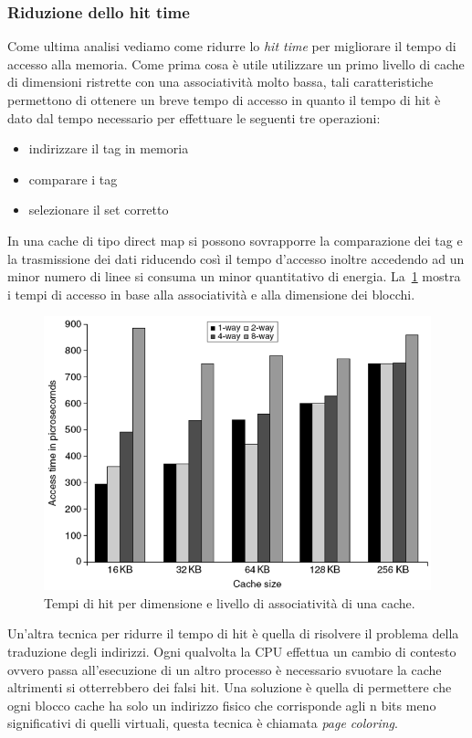 \subsubsection{Riduzione dello hit time}
Come ultima analisi vediamo come ridurre lo \emph{hit time} per migliorare il tempo di accesso alla memoria. Come prima cosa è utile utilizzare un primo livello di cache di dimensioni ristrette con una associatività molto bassa, tali caratteristiche permettono di ottenere un breve tempo di accesso in quanto il tempo di hit è dato dal tempo necessario per effettuare le seguenti tre operazioni:
\begin{itemize}
\item indirizzare il tag in memoria
\item comparare i tag
\item selezionare il set corretto
\end{itemize}
In una cache di tipo direct map si possono sovrapporre la comparazione dei tag e la trasmissione dei dati riducendo così il tempo d'accesso inoltre accedendo ad un minor numero di linee si consuma un minor quantitativo di energia. La \figurename\,\ref{fig:hittimel1} mostra i tempi di accesso in base alla associatività e alla dimensione dei blocchi.
\begin{figure}[htb]
\centering
\includegraphics[scale=0.5]{img/hittimel1.png}
\caption{Tempi di hit per dimensione e livello di associatività di una cache.}\label{fig:hittimel1}
\end{figure}
Un'altra tecnica per ridurre il tempo di hit è quella di risolvere il problema della traduzione degli indirizzi. Ogni qualvolta la CPU effettua un cambio di contesto ovvero passa all'esecuzione di un altro processo è necessario svuotare la cache altrimenti si otterrebbero dei falsi hit. Una soluzione è quella di permettere che ogni blocco cache ha solo un indirizzo fisico che corrisponde agli n bits meno significativi di quelli virtuali, questa tecnica è chiamata \emph{page coloring}.
